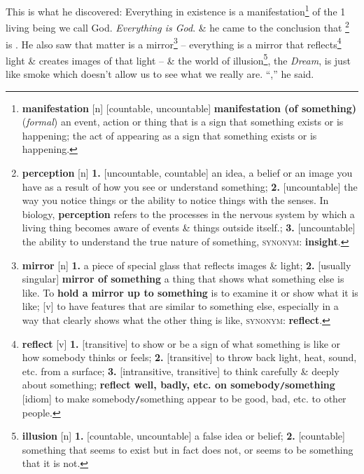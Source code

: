 \documentclass[oneside]{book}
\numberwithin{equation}{section}
\begin{document}
This is what he discovered: Everything in existence is a manifestation\footnote{\textbf{manifestation} [n] [countable, uncountable] \textbf{manifestation (of something)} (\textit{formal}) an event, action or thing that is a sign that something exists or is happening; the act of appearing as a sign that something exists or is happening.} of the 1 living being we call God. \textit{Everything is God}. \& he came to the conclusion that \footnote{\textbf{perception} [n] \textbf{1.} [uncountable, countable] an idea, a belief or an image you have as a result of how you see or understand something; \textbf{2.} [uncountable] the way you notice things or the ability to notice things with the senses. In biology, \textbf{perception} refers to the processes in the nervous system by which a living thing becomes aware of events \& things outside itself.; \textbf{3.} [uncountable] the ability to understand the true nature of something, \textsc{synonym}: \textbf{insight}.} is . He also saw that matter is a mirror\footnote{\textbf{mirror} [n] \textbf{1.} a piece of special glass that reflects images \& light; \textbf{2.} [usually singular] \textbf{mirror of something} a thing that shows what something else is like. To \textbf{hold a mirror up to something} is to examine it or show what it is like; [v] to have features that are similar to something else, especially in a way that clearly shows what the other thing is like, \textsc{synonym}: \textbf{reflect}.} -- everything is a mirror that reflects\footnote{\textbf{reflect} [v] \textbf{1.} [transitive] to show or be a sign of what something is like or how somebody thinks or feels; \textbf{2.} [transitive] to throw back light, heat, sound, etc. from a surface; \textbf{3.} [intransitive, transitive] to think carefully \& deeply about something; \textbf{reflect well, badly, etc. on somebody\texttt{/}something} [idiom] to make somebody\texttt{/}something appear to be good, bad, etc. to other people.} light \& creates images of that light -- \& the world of illusion\footnote{\textbf{illusion} [n] \textbf{1.} [countable, uncountable] a false idea or belief; \textbf{2.} [countable] something that seems to exist but in fact does not, or seems to be something that it is not.}, the \textit{Dream}, is just like smoke which doesn't allow us to see what we really are. ``,'' he said.
\end{document}
